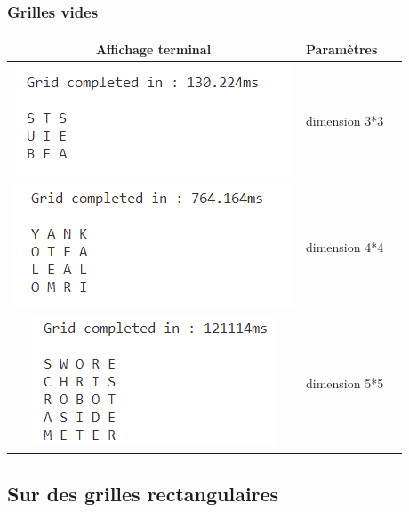 \documentclass [ 11 pt ] {article}
\begin{document}
    \subsubsection{Grilles vides}
    \begin{center}
    \begin{tabular}{ | c |  m{5cm} | m{5cm} | }
    \hline
    Affichage terminal & Paramètres \\ 
    \hline
      \includegraphics[]{3.png}
    & dimension 3*3 \\
    \hline
      \includegraphics[]{4.png}
    & dimension 4*4 \\
    \hline
      \includegraphics[]{5_5.png}
    & dimension 5*5 \\
    \hline
    \end{tabular}
    \end{center}
    \subsection{Sur des grilles rectangulaires} 
\end{document}
